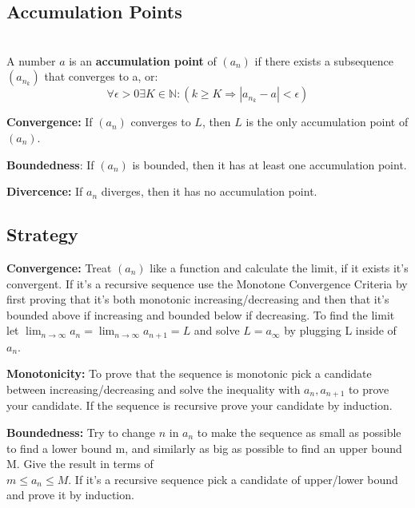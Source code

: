 \documentclass[8pt,a4paper]{extarticle}     %
\theoremstyle{definition}
\theoremstyle{definition}
\theoremstyle{definition}
\newcommand{\N}{\mathbb{N}}
\begin{document}
\begin{multicols}{4}
\subsection{Accumulation Points}
\begin{boxdefinition}\ \\
	A number $a$ is an \textbf{accumulation point} of $(a_n)$ if there exists a subsequence $(a_{n_k})$ that converges to a, or:
	$$\forall\epsilon > 0 \exists K \in \N: (k\geq K \Rightarrow |a_{n_k} - a| < \epsilon)$$
\end{boxdefinition}
\begin{eqlist}
	\item \textbf{Convergence:} If $(a_n)$ converges to $L$, then $L$ is the only accumulation point of $(a_n)$.
	\item \textbf{Boundedness}: If $(a_n)$ is bounded, then it has at least one accumulation point. 
	\item \textbf{Divercence:} If $a_n$ diverges, then it has no accumulation point. 
\end{eqlist}


\subsection{Strategy}
\begin{bulletlist}
	\item \textbf{Convergence:} Treat $(a_n)$ like a function and calculate the limit, if it exists it's convergent. If it's a recursive sequence use the Monotone Convergence Criteria by first proving that it's both monotonic increasing/decreasing and then that it's bounded above if increasing and bounded below if decreasing. To find the limit let $\lim_{n\to\infty}a_n = \lim_{n\to\infty}a_{n+1} = L$ and solve $L = a_\infty$ by plugging L inside of $a_n$.
	\item \textbf{Monotonicity:} To prove that the sequence is monotonic pick a candidate between increasing/decreasing and solve the inequality with $a_n, a_{n+1}$ to prove your candidate. If the sequence is recursive prove your candidate by induction. 
	\item \textbf{Boundedness:} Try to change $n$ in $a_n$ to make the sequence as small as possible to find a lower bound m, and similarly as big as possible to find an upper bound M. Give the result in terms of \\$m \leq a_n \leq M$.  
	If it's a recursive sequence pick a candidate of upper/lower bound and prove it by induction. 
\end{bulletlist}


\end{multicols}
\end{document}
